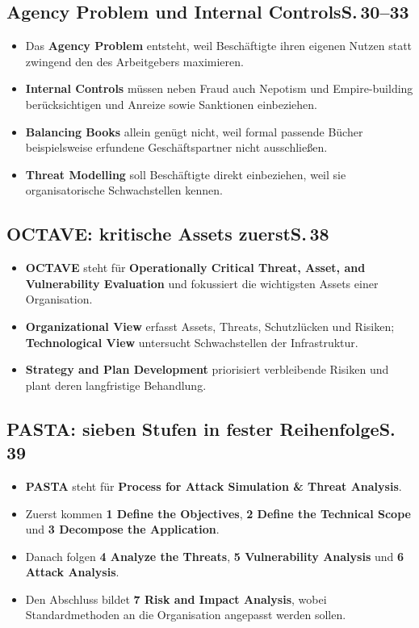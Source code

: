 \documentclass[11pt,a4paper]{article}
\newcommand{\block}[2]{\subsection*{#1\hfill{\normalfont\small #2}}}
\begin{document}
\block{Agency Problem und Internal Controls}{S.\,30--33}
\begin{itemize}
\item Das \textbf{Agency Problem} entsteht, weil Beschäftigte ihren eigenen Nutzen statt zwingend den des Arbeitgebers maximieren.
\item \textbf{Internal Controls} müssen neben Fraud auch Nepotism und Empire-building berücksichtigen und Anreize sowie Sanktionen einbeziehen.
\item \textbf{Balancing Books} allein genügt nicht, weil formal passende Bücher beispielsweise erfundene Geschäftspartner nicht ausschließen.
\item \textbf{Threat Modelling} soll Beschäftigte direkt einbeziehen, weil sie organisatorische Schwachstellen kennen.
\end{itemize}

\block{OCTAVE: kritische Assets zuerst}{S.\,38}
\begin{itemize}
\item \textbf{OCTAVE} steht für \textbf{Operationally Critical Threat, Asset, and Vulnerability Evaluation} und fokussiert die wichtigsten Assets einer Organisation.
\item \textbf{Organizational View} erfasst Assets, Threats, Schutzlücken und Risiken; \textbf{Technological View} untersucht Schwachstellen der Infrastruktur.
\item \textbf{Strategy and Plan Development} priorisiert verbleibende Risiken und plant deren langfristige Behandlung.
\end{itemize}

\block{PASTA: sieben Stufen in fester Reihenfolge}{S.\,39}
\begin{itemize}
\item \textbf{PASTA} steht für \textbf{Process for Attack Simulation \& Threat Analysis}.
\item Zuerst kommen \textbf{1 Define the Objectives}, \textbf{2 Define the Technical Scope} und \textbf{3 Decompose the Application}.
\item Danach folgen \textbf{4 Analyze the Threats}, \textbf{5 Vulnerability Analysis} und \textbf{6 Attack Analysis}.
\item Den Abschluss bildet \textbf{7 Risk and Impact Analysis}, wobei Standardmethoden an die Organisation angepasst werden sollen.
\end{itemize}
\end{document}
